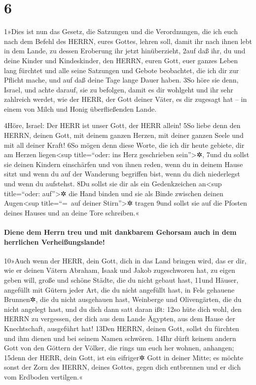 \hypertarget{section-5}{%
\section{6}\label{section-5}}

1»Dies ist nun das Gesetz, die Satzungen und die Verordnungen, die ich
euch nach dem Befehl des HERRN, eures Gottes, lehren soll, damit ihr
nach ihnen lebt in dem Lande, zu dessen Eroberung ihr jetzt
hinüberzieht, 2auf daß ihr, du und deine Kinder und Kindeskinder, den
HERRN, euren Gott, euer ganzes Leben lang fürchtet und alle seine
Satzungen und Gebote beobachtet, die ich dir zur Pflicht mache, und auf
daß deine Tage lange Dauer haben. 3So höre sie denn, Israel, und achte
darauf, sie zu befolgen, damit es dir wohlgeht und ihr sehr zahlreich
werdet, wie der HERR, der Gott deiner Väter, es dir zugesagt hat -- in
einem von Milch und Honig überfließenden Lande.

4Höre, Israel: Der HERR ist unser Gott, der HERR allein! 5So liebe denn
den HERRN, deinen Gott, mit deinem ganzen Herzen, mit deiner ganzen
Seele und mit all deiner Kraft! 6So mögen denn diese Worte, die ich dir
heute gebiete, dir am Herzen liegen\textless sup title=``oder: ins Herz
geschrieben sein''\textgreater✲, 7und du sollst sie deinen Kindern
einschärfen und von ihnen reden, wenn du in deinem Hause sitzt und wenn
du auf der Wanderung begriffen bist, wenn du dich niederlegst und wenn
du aufstehst. 8Du sollst sie dir als ein Gedenkzeichen an\textless sup
title=``oder: auf''\textgreater✲ die Hand binden und sie als Binde
zwischen deinen Augen\textless sup title=``=~auf deiner
Stirn''\textgreater✲ tragen 9und sollst sie auf die Pfosten deines
Hauses und an deine Tore schreiben.«

\hypertarget{diene-dem-herrn-treu-und-mit-dankbarem-gehorsam-auch-in-dem-herrlichen-verheiuxdfungslande}{%
\paragraph{Diene dem Herrn treu und mit dankbarem Gehorsam auch in dem
herrlichen
Verheißungslande!}\label{diene-dem-herrn-treu-und-mit-dankbarem-gehorsam-auch-in-dem-herrlichen-verheiuxdfungslande}}

10»Auch wenn der HERR, dein Gott, dich in das Land bringen wird, das er
dir, wie er deinen Vätern Abraham, Isaak und Jakob zugeschworen hat, zu
eigen geben will, große und schöne Städte, die du nicht gebaut hast,
11und Häuser, angefüllt mit Gütern jeder Art, die du nicht angefüllt
hast, in Fels gehauene Brunnen✲, die du nicht ausgehauen hast, Weinberge
und Olivengärten, die du nicht angelegt hast, und du dich dann satt
daran ißt: 12so hüte dich wohl, den HERRN zu vergessen, der dich aus dem
Lande Ägypten, aus dem Hause der Knechtschaft, ausgeführt hat! 13Den
HERRN, deinen Gott, sollst du fürchten und ihm dienen und bei seinem
Namen schwören. 14Ihr dürft keinem andern Gott von den Göttern der
Völker, die rings um euch her wohnen, anhangen; 15denn der HERR, dein
Gott, ist ein eifriger✲ Gott in deiner Mitte; es möchte sonst der Zorn
des HERRN, deines Gottes, gegen dich entbrennen und er dich vom Erdboden
vertilgen.«

